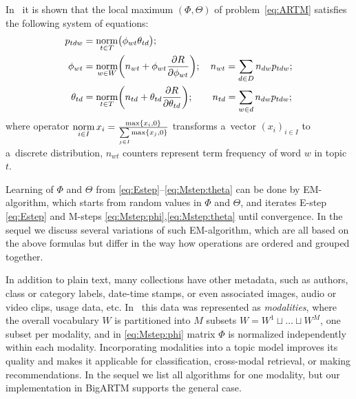 \documentclass[russian,english]{llncs}
\newcommand{\norm}{\mathop{\rm norm}\limits}
\begin{document}
In~\cite{voron14dan-eng} it is shown that the \mbox{local} maximum $(\Phi,\Theta)$
of problem~\eqref{eq:ARTM} satisfies
the following system of equations:
\begin{align}
    \label{eq:Estep}
    p_{tdw} &= \norm_{t\in T} \bigl(\phi_{wt}\theta_{td}\bigr);
\\
    \label{eq:Mstep:phi}
    \phi_{wt} &= \norm_{w\in W}
        \biggl(
            n_{wt} + \phi_{wt} \frac{\partial R}{\partial \phi_{wt}}
        \biggr);
        \quad
            n_{wt} = \sum_{d\in D} n_{dw} p_{tdw};
\\
    \label{eq:Mstep:theta}
    \theta_{td} &= \norm_{t\in T}
        \biggl(
            n_{td} + \theta_{td} \frac{\partial R}{\partial \theta_{td}}
        \biggr);
        \quad\quad
            n_{td} = \sum_{w\in d} n_{dw} p_{tdw};
\end{align}
where operator
$\norm_{i \in I} x_i = \frac{\max\{x_i,0\}}{\sum\limits_{j\in I} \max\{x_j,0\}}$
transforms a~vector $(x_i)_{i \in I}$ to a~discrete distribution,
$n_{wt}$ counters represent term frequency of word $w$ in topic $t$.

Learning of $\Phi$ and $\Theta$ from \eqref{eq:Estep}--\eqref{eq:Mstep:theta} can be done by EM-algorithm,
which starts from random values in $\Phi$ and $\Theta$, and iterates
E-step \eqref{eq:Estep} and
M-steps \eqref{eq:Mstep:phi},\eqref{eq:Mstep:theta}
until convergence.
In the sequel we discuss several variations of such EM-algorithm,
which are all based on the above formulas but differ in the way how operations are ordered and grouped together.

In addition to plain text, many collections have other metadata,
such as authors, class or category labels, date-time stamps,
or even associated images, audio or video clips, usage data, etc.
In~\cite{voron15nonbayesian} this data was represented as \emph{modalities},
where the overall vocabulary $W$ is partitioned into $M$ subsets
$W = W^1 \sqcup \dots \sqcup W^M$, one subset per modality,
and in \eqref{eq:Mstep:phi} matrix $\Phi$ is normalized independently 
within each modality.
Incorporating modalities into a topic model improves its quality
and makes it applicable for classification, cross-modal retrieval, or making recommendations.
In the sequel we list all algorithms for one modality,
but our implementation in BigARTM supports the general case.
\end{document}
